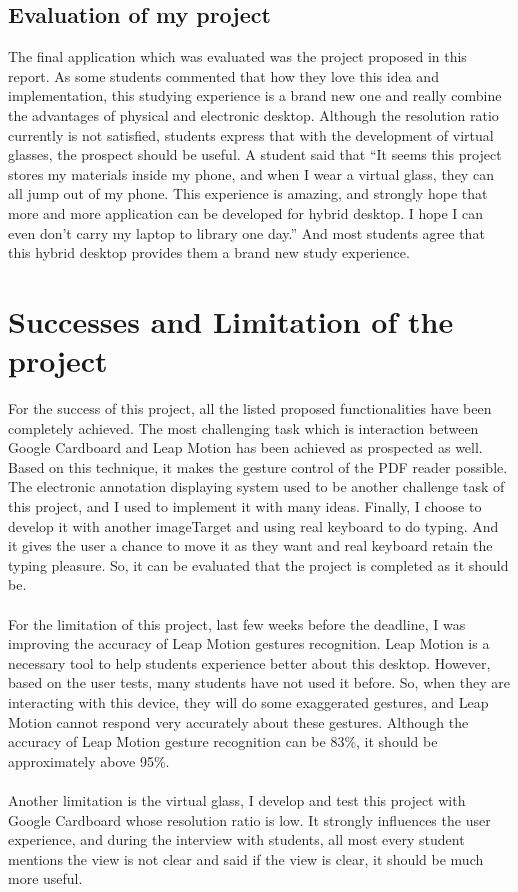 \subsection{Evaluation of my project}
The final application which was evaluated was the project proposed in this report. As some students commented that how they love this idea and implementation, this studying experience is a brand new one and really combine the advantages of physical and electronic desktop. Although the resolution ratio currently is not satisfied, students express that with the development of virtual glasses, the prospect should be useful. A student said that “It seems this project stores my materials inside my phone, and when I wear a virtual glass, they can all jump out of my phone. This experience is amazing, and strongly hope that more and more application can be developed for hybrid desktop. I hope I can even don’t carry my laptop to library one day.” And most students agree that this hybrid desktop provides them a brand new study experience.

\section{Successes and Limitation of the project}
For the success of this project, all the listed proposed functionalities have been completely achieved. The most challenging task which is interaction between Google Cardboard and Leap Motion has been achieved as prospected as well. Based on this technique, it makes the gesture control of the PDF reader possible. The electronic annotation displaying system used to be another challenge task of this project, and I used to implement it with many ideas. Finally, I choose to develop it with another imageTarget and using real keyboard to do typing. And it gives the user a chance to move it as they want and real keyboard retain the typing pleasure. So, it can be evaluated that the project is completed as it should be.
\\
\\
For the limitation of this project, last few weeks before the deadline, I was improving the accuracy of Leap Motion gestures recognition. Leap Motion is a necessary tool to help students experience better about this desktop. However, based on the user tests, many students have not used it before. So, when they are interacting with this device, they will do some exaggerated gestures, and Leap Motion cannot respond very accurately about these gestures. Although the accuracy of Leap Motion gesture recognition can be 83\%, it should be approximately above 95\%.
\\
\\ 
Another limitation is the virtual glass, I develop and test this project with Google Cardboard whose resolution ratio is low. It strongly influences the user experience, and during the interview with students, all most every student mentions the view is not clear and said if the view is clear, it should be much more useful. 
